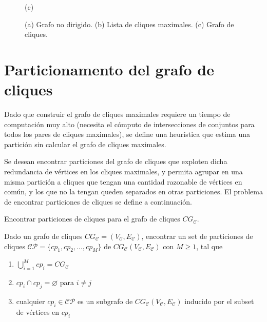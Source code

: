 \begin{figure}
\begin{minipage}{0.15\textwidth}
    		(c)
    	\end{minipage}
    \caption{(a) Grafo no dirigido. (b) Lista de cliques maximales. (c) Grafo de cliques.}
    \label{fig:gafoEj}
\end{figure}




\section{Particionamento del grafo de cliques}
Dado que construir el grafo de cliques maximales requiere un tiempo de computación muy alto (necesita el cómputo de intersecciones de conjuntos para todos los pares de cliques maximales), se define una heurística que estima una partición sin calcular el grafo de cliques maximales.

Se desean encontrar particiones del grafo de cliques que exploten dicha redundancia de vértices en los cliques maximales, y permita agrupar en una misma partición a cliques que tengan una cantidad razonable de vértices en común, y los que no la tengan queden separados en otras particiones. El problema de encontrar particiones de cliques se define a continuación.

\begin{problem}
	\label{def:findPartitions}
	Encontrar particiones de cliques para el grafo de cliques $CG_{\mathcal{C}}$.
	
	Dado un grafo de cliques $CG_{\mathcal{C}} = (V_{\mathcal{C}}, E_{\mathcal{C}})$, encontrar un set de particiones de cliques $\mathcal{C}\mathcal{P} = \{cp_{1}, cp_{2}, ..., cp_{M}\}$ de $CG_{\mathcal{C}}(V_{\mathcal{C}}, E_{\mathcal{C}})$ con $M \geq 1$, tal que
	\begin{enumerate}
		\item $\bigcup\limits_{i = 1}^{M} cp_{i} = CG_{\mathcal{C}}$ \label{item:particiones1}
		\item $cp_{i} \cap cp_{j} = \varnothing$ para $i \neq j$ \label{item:particiones2}
		\item cualquier $cp_{i} \in \mathcal{C}\mathcal{P}$ es un subgrafo de $CG_{\mathcal{C}}(V_{\mathcal{C}}, E_{\mathcal{C}})$ inducido por el subset de vértices en $cp_{i}$ \label{item:particiones3}
	\end{enumerate}
	
\end{problem}

